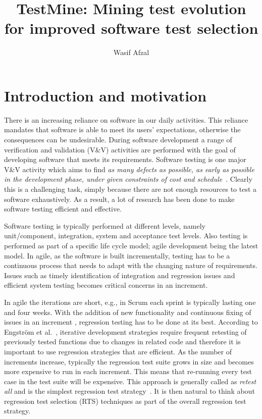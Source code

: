 \documentclass[11pt, oneside]{article}   	%
\title{TestMine: Mining test evolution for improved software test selection}
\author{Wasif Afzal}
\date{}							%
\begin{document}
\maketitle
\section{Introduction and motivation}\label{sec:intro}
There is an increasing reliance on software in our daily activities. This reliance mandates that software is able to meet its users' expectations, otherwise the consequences can be undesirable. During software development a range of verification and validation (V\&V) activities are performed with the goal of developing software that meets its requirements. Software testing is one major V\&V activity which aims to find \textit{as many defects as possible, as early as possible in the development phase, under given constraints of cost and schedule}~\cite{29119}. Clearly this is a challenging task, simply because there are not enough resources to test a software exhaustively. As a result, a lot of research has been done to make software testing efficient and effective. 

Software testing is typically performed at different levels, namely unit/component, integration, system and acceptance test levels. Also testing is performed as part of a specific life cycle model; agile development being the latest model. In agile, as the software is built incrementally, testing has to be a continuous process that needs to adapt with the changing nature of requirements. Issues such as timely identification of integration and regression issues and efficient system testing becomes critical concerns in an increment. %


In agile the iterations are short, e.g., in Scrum each sprint is typically lasting one and four weeks. With the addition of new functionality and continuous fixing of issues in an increment%
, regression testing has to be done at its best. According to Engstr\"{o}m et al.~\cite{Emelie10}, iterative development strategies require frequent retesting of previously tested functions due to changes in related code and therefore it is important to use regression strategies that are efficient. As the number of increments increase, typically the regression test suite grows in size and becomes more expensive to run in each increment. This means that re-running every test case in the test suite will be expensive. This approach is generally called as \textit{retest all} and is the simplest regression test strategy~\cite{Graves01}. It is then natural to think about regression test selection (RTS) techniques as part of the overall regression test strategy. 
\end{document}
